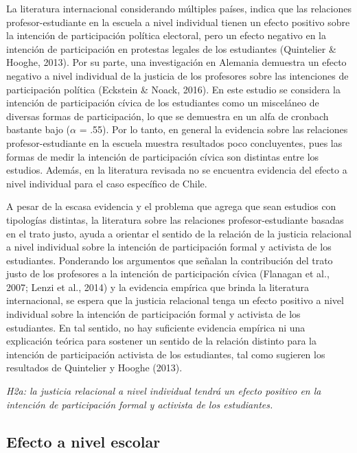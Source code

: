 \documentclass[12pt,twoside]{templates/facsothesis}
\begin{document}
La literatura internacional considerando múltiples países, indica que las relaciones profesor-estudiante en la escuela a nivel individual tienen un efecto positivo sobre la intención de participación política electoral, pero un efecto negativo en la intención de participación en protestas legales de los estudiantes (Quintelier \& Hooghe, 2013). Por su parte, una investigación en Alemania demuestra un efecto negativo a nivel individual de la justicia de los profesores sobre las intenciones de participación política (Eckstein \& Noack, 2016). En este estudio se considera la intención de participación cívica de los estudiantes como un misceláneo de diversas formas de participación, lo que se demuestra en un alfa de cronbach bastante bajo (\(\alpha\) = .55). Por lo tanto, en general la evidencia sobre las relaciones profesor-estudiante en la escuela muestra resultados poco concluyentes, pues las formas de medir la intención de participación cívica son distintas entre los estudios. Además, en la literatura revisada no se encuentra evidencia del efecto a nivel individual para el caso específico de Chile.

A pesar de la escasa evidencia y el problema que agrega que sean estudios con tipologías distintas, la literatura sobre las relaciones profesor-estudiante basadas en el trato justo, ayuda a orientar el sentido de la relación de la justicia relacional a nivel individual sobre la intención de participación formal y activista de los estudiantes. Ponderando los argumentos que señalan la contribución del trato justo de los profesores a la intención de participación cívica (Flanagan et al., 2007; Lenzi et al., 2014) y la evidencia empírica que brinda la literatura internacional, se espera que la justicia relacional tenga un efecto positivo a nivel individual sobre la intención de participación formal y activista de los estudiantes. En tal sentido, no hay suficiente evidencia empírica ni una explicación teórica para sostener un sentido de la relación distinto para la intención de participación activista de los estudiantes, tal como sugieren los resultados de Quintelier y Hooghe (2013).

\emph{H2a: la justicia relacional a nivel individual tendrá un efecto positivo en la intención de participación formal y activista de los estudiantes.}

\hypertarget{efecto-a-nivel-escolar-1}{%
\subsection{Efecto a nivel escolar}\label{efecto-a-nivel-escolar-1}}
\end{document}
